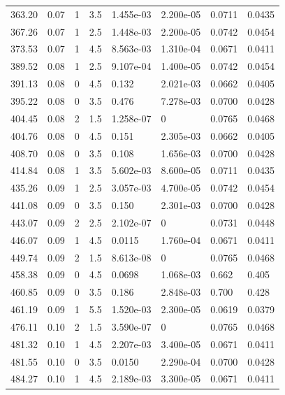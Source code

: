 \documentclass[preview]{standalone}
\begin{document}
{{{\begin{tabular}{L{1.2cm}C{1.2cm} C{0.3cm}C{0.5cm} C{1.4cm}C{1.4cm} C{1.4cm}C{1.4cm}}
  363.20  &  0.07  & 1     & 3.5 &  1.455e-03  & 2.200e-05  & 0.0711 &  0.0435   \\ 
  367.26  &  0.07  & 1     & 2.5 &  1.448e-03  & 2.200e-05  & 0.0742 &  0.0454   \\ 
  373.53  &  0.07  & 1     & 4.5 &  8.563e-03  & 1.310e-04  & 0.0671 &  0.0411   \\ 
  389.52  &  0.08  & 1     & 2.5 &  9.107e-04  & 1.400e-05  & 0.0742 &  0.0454   \\ 
  391.13  &  0.08  & 0     & 4.5 &  0.132  & 2.021e-03  & 0.0662 &  0.0405   \\ 
  395.22  &  0.08  & 0     & 3.5 &  0.476  & 7.278e-03  & 0.0700 &  0.0428   \\ 
  404.45  &  0.08  & 2     & 1.5 &  1.258e-07  & 0  & 0.0765 &  0.0468   \\ 
  404.76  &  0.08  & 0     & 4.5 &  0.151  & 2.305e-03  & 0.0662 &  0.0405   \\ 
  408.70  &  0.08  & 0     & 3.5 &  0.108  & 1.656e-03  & 0.0700 &  0.0428   \\ 
  414.84  &  0.08  & 1     & 3.5 &  5.602e-03  & 8.600e-05  & 0.0711 &  0.0435   \\ 
  435.26  &  0.09  & 1     & 2.5 &  3.057e-03  & 4.700e-05  & 0.0742 &  0.0454   \\ 
  441.08  &  0.09  & 0     & 3.5 &  0.150  & 2.301e-03  & 0.0700 &  0.0428   \\ 
  443.07  &  0.09  & 2     & 2.5 &  2.102e-07  & 0  & 0.0731 &  0.0448   \\ 
  446.07  &  0.09  & 1     & 4.5 &  0.0115  & 1.760e-04  & 0.0671 &  0.0411   \\ 
  449.74  &  0.09  & 2     & 1.5 &  8.613e-08  & 0  & 0.0765 &  0.0468   \\ 
  458.38  &  0.09  & 0     & 4.5 &  0.0698  & 1.068e-03  & 0.662 &  0.405   \\ 
  460.85  &  0.09  & 0     & 3.5 &  0.186  & 2.848e-03  & 0.700 &  0.428   \\ 
  461.19  &  0.09  & 1     & 5.5 &  1.520e-03  & 2.300e-05  & 0.0619 &  0.0379   \\ 
  476.11  &  0.10  & 2     & 1.5 &  3.590e-07  & 0  & 0.0765 &  0.0468   \\ 
  481.32  &  0.10  & 1     & 4.5 &  2.207e-03  & 3.400e-05  & 0.0671 &  0.0411   \\ 
  481.55  &  0.10  & 0     & 3.5 &  0.0150  & 2.290e-04  & 0.0700 &  0.0428   \\ 
  484.27  &  0.10  & 1     & 4.5 &  2.189e-03  & 3.300e-05  & 0.0671 &  0.0411   \\ 

\end{tabular}}}}
\end{document}
